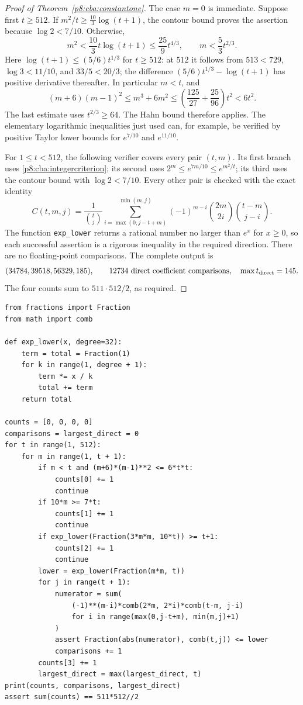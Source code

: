 \documentclass[11pt,a4paper]{article}
\theoremstyle{definition}
\theoremstyle{remark}
\numberwithin{equation}{section}
\begin{document}
\begin{proof}[Proof of Theorem~\ref{p8:cba:constantone}]
The case $m=0$ is immediate. Suppose first $t\ge512$.
If $m^2/t\ge\frac{10}{3}\log(t+1)$, the contour bound proves the
assertion because $\log2<7/10$. Otherwise,
\[
 m^2<\frac{10}{3}t\log(t+1)\le\frac{25}{9}t^{4/3},
 \qquad m<\frac53t^{2/3}.
\]
Here $\log(t+1)\le(5/6)t^{1/3}$ for $t\ge512$: at $512$ it follows
from $513<729$, $\log3<11/10$, and $33/5<20/3$; the difference
$(5/6)t^{1/3}-\log(t+1)$ has positive derivative thereafter.
In particular $m<t$, and
\[
 (m+6)(m-1)^2\le m^3+6m^2
 \le\left(\frac{125}{27}+\frac{25}{96}\right)t^2<6t^2.
\]
The last estimate uses $t^{2/3}\ge64$. The Hahn bound therefore applies.
The elementary logarithmic inequalities just used can, for example, be
verified by positive Taylor lower bounds for $e^{7/10}$ and $e^{11/10}$.

For $1\le t<512$, the following verifier covers every pair $(t,m)$.
Its first branch uses \eqref{p8:cba:integercriterion}; its second uses
$2^m\le e^{7m/10}\le e^{m^2/t}$; its third uses the contour bound with
$\log2<7/10$. Every other pair is checked with the exact identity
\begin{equation}\label{p8:cba:exactcoeff}
 C(t,m,j)=\frac1{\binom tj}
 \sum_{i=\max(0,j-t+m)}^{\min(m,j)}
 (-1)^{m-i}\binom{2m}{2i}\binom{t-m}{j-i}.
\end{equation}
The function \texttt{exp\_lower} returns a rational number no larger
than $e^x$ for $x\ge0$, so each successful assertion is a rigorous
inequality in the required direction. There are no floating-point
comparisons. The complete output is
\[
 (34784,39518,56329,185),\qquad
 12734\ \hbox{direct coefficient comparisons},\quad
 \max t_{\rm direct}=145.
\]
The four counts sum to $511\cdot512/2$, as required.
\end{proof}

\noindent\begin{minipage}{\textwidth}\small
\begin{verbatim}
from fractions import Fraction
from math import comb

def exp_lower(x, degree=32):
    term = total = Fraction(1)
    for k in range(1, degree + 1):
        term *= x / k
        total += term
    return total

counts = [0, 0, 0, 0]
comparisons = largest_direct = 0
for t in range(1, 512):
    for m in range(1, t + 1):
        if m < t and (m+6)*(m-1)**2 <= 6*t*t:
            counts[0] += 1
            continue
        if 10*m >= 7*t:
            counts[1] += 1
            continue
        if exp_lower(Fraction(3*m*m, 10*t)) >= t+1:
            counts[2] += 1
            continue
        lower = exp_lower(Fraction(m*m, t))
        for j in range(t + 1):
            numerator = sum(
                (-1)**(m-i)*comb(2*m, 2*i)*comb(t-m, j-i)
                for i in range(max(0,j-t+m), min(m,j)+1)
            )
            assert Fraction(abs(numerator), comb(t,j)) <= lower
            comparisons += 1
        counts[3] += 1
        largest_direct = max(largest_direct, t)
print(counts, comparisons, largest_direct)
assert sum(counts) == 511*512//2
\end{verbatim}
\end{minipage}
\end{document}

